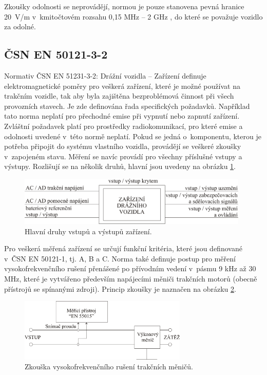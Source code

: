 Zkoušky odolnosti se neprovádějí, normou je pouze stanovena pevná hranice 20~V/m v~kmitočtovém rozsahu 0,15 MHz – 2 GHz , do které se považuje vozidlo za odolné.

\subsection{ČSN EN 50121-3-2}
Normativ ČSN EN 51231-3-2: Drážní vozidla – Zařízení definuje elektromagnetické poměry pro veškerá zařízení, které je možné používat na trakčním vozidle, tak aby byla zajištěna bezproblémová činnost při všech provozních stavech. Je zde definována řada specifických požadavků. Například tato norma neplatí pro přechodné emise při vypnutí nebo zapnutí zařízení. Zvláštní požadavek platí pro prostředky radiokomunikací, pro které emise a odolnosti uvedené v~této normě neplatí. Pokud se jedná o~komponentu, kterou je potřeba připojit do systému vlastního vozidla, provádějí se veškeré zkoušky v~zapojeném stavu. Měření se navíc provádí pro všechny příslušné vstupy a výstupy. 
Rozlišují se na několik druhů, hlavní jsou uvedeny na obrázku \ref{obr:emc_IO}.

\begin{figure}[!h]
	\centering
	\includegraphics[width=11cm]{emc_IO.png}
	\caption{Hlavní druhy vstupů a výstupů zařízení. \cite{csn}}
	\label{obr:emc_IO}
\end{figure}

Pro veškerá měřená zařízení se určují funkční kritéria, které jsou definované v~ČSN EN 50121-1, tj. A, B a C. Norma také definuje postup pro měření vysokofrekvenčního rušení přenášené po přívodním vedení v~pásmu 9 kHz až 30 MHz, které je vytvářeno především napájecími měniči trakčních motorů (obecně přístrojů se spínanými zdroji). Princip zkoušky je naznačen na obrázku \ref{obr:emc_vf}. 

\begin{figure}[!h]
	\centering
	\includegraphics[width=8cm]{emc_vf.png}
	\caption{Zkouška vysokofrekvenčního rušení trakčních měničů. \cite{csn}}
	\label{obr:emc_vf}
\end{figure}

